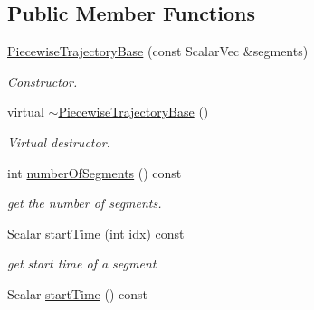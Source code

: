 \subsection*{Public Member Functions}
\begin{DoxyCompactItemize}
\item 
\hyperlink{classow__core_1_1PiecewiseTrajectoryBase_a53d4ad3fe326d8491b7edb6d01622baa}{Piecewise\+Trajectory\+Base} (const Scalar\+Vec \&segments)
\begin{DoxyCompactList}\small\item\em Constructor. \end{DoxyCompactList}\item 
virtual \hyperlink{classow__core_1_1PiecewiseTrajectoryBase_ab5da82bb273a05c6f22c5e889f858df4}{$\sim$\+Piecewise\+Trajectory\+Base} ()\hypertarget{classow__core_1_1PiecewiseTrajectoryBase_ab5da82bb273a05c6f22c5e889f858df4}{}\label{classow__core_1_1PiecewiseTrajectoryBase_ab5da82bb273a05c6f22c5e889f858df4}

\begin{DoxyCompactList}\small\item\em Virtual destructor. \end{DoxyCompactList}\item 
int \hyperlink{classow__core_1_1PiecewiseTrajectoryBase_a19b563f322f931373b6f5f5c7415b849}{number\+Of\+Segments} () const \hypertarget{classow__core_1_1PiecewiseTrajectoryBase_a19b563f322f931373b6f5f5c7415b849}{}\label{classow__core_1_1PiecewiseTrajectoryBase_a19b563f322f931373b6f5f5c7415b849}

\begin{DoxyCompactList}\small\item\em get the number of segments. \end{DoxyCompactList}\item 
Scalar \hyperlink{classow__core_1_1PiecewiseTrajectoryBase_a68e449b49eea796cfcdce6c269817b72}{start\+Time} (int idx) const \hypertarget{classow__core_1_1PiecewiseTrajectoryBase_a68e449b49eea796cfcdce6c269817b72}{}\label{classow__core_1_1PiecewiseTrajectoryBase_a68e449b49eea796cfcdce6c269817b72}

\begin{DoxyCompactList}\small\item\em get start time of a segment \end{DoxyCompactList}\item 
Scalar \hyperlink{classow__core_1_1PiecewiseTrajectoryBase_a000aeb33f7a1e799259cb7496ed2d9e3}{start\+Time} () const \hypertarget{classow__core_1_1PiecewiseTrajectoryBase_a000aeb33f7a1e799259cb7496ed2d9e3}{}\label{classow__core_1_1PiecewiseTrajectoryBase_a000aeb33f7a1e799259cb7496ed2d9e3}


\end{DoxyCompactItemize}
